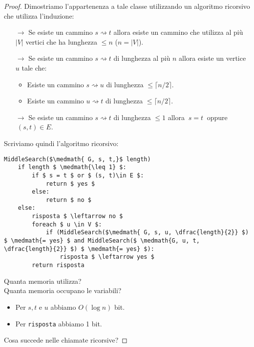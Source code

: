 \documentclass[a4paper]{article}
\theoremstyle{definition}
\begin{document}
		\begin{proof}
			Dimostriamo l'appartenenza a tale classe utilizzando un algoritmo ricorsivo che utilizza l'induzione:
			
			\begin{itemize}
				\item[$ \rightarrow $] Se esiste un cammino $ s\rightsquigarrow t $ allora esiste un cammino che utilizza al più $ |V| $ vertici che ha lunghezza $ \leq n $ ($ n = |V| $).
				\item[$ \rightarrow $] Se esiste un cammino $ s\rightsquigarrow t $ di lunghezza al più $ n $ allora esiste un vertice $ u $ tale che:
				\begin{itemize}
					\item Esiste un cammino $ s\rightsquigarrow u $ di lunghezza $ \leq \lceil n/2 \rceil $.
					\item Esiste un cammino $ u\rightsquigarrow t $ di lunghezza $ \leq \lceil n/2 \rceil $.
				\end{itemize}
				\item[$ \rightarrow $] Se esiste un cammino $ s\rightsquigarrow t $ di lunghezza $ \leq 1 $ allora $ \ s = t\ $ oppure $ \ (s, t)\in E $.
			\end{itemize}
			Scriviamo quindi l'algoritmo ricorsivo:
			
			\begin{lstlisting}[mathescape=true, frame=tb, caption={Algoritmo ricorsivo per risolvere Reachability}, basicstyle=\footnotesize\ttfamily]
MiddleSearch($\medmath{ G, s, t,}$ length)
	if length $ \medmath{\leq 1} $:
		if $ s = t $ or $ (s, t)\in E $:
			return $ yes $
		else:
			return $ no $
	else:
		risposta $ \leftarrow no $
		foreach $ u \in V $:
			if (MiddleSearch($\medmath{ G, s, u, \dfrac{length}{2}} $) $ \medmath{= yes} $ and MiddleSearch($ \medmath{G, u, t, \dfrac{length}{2}} $) $ \medmath{= yes} $):
				risposta $ \leftarrow yes $
		return risposta
			\end{lstlisting}
			Quanta memoria utilizza?\\
			Quanta memoria occupano le variabili?
			\begin{itemize}
				\item Per $ s, t $ e $ u $ abbiamo $ O(\log n) $ bit.
				\item Per \lstinline|risposta| abbiamo 1 bit.
			\end{itemize}
			Cosa succede nelle chiamate ricorsive?
			

\end{proof}
\end{document}
